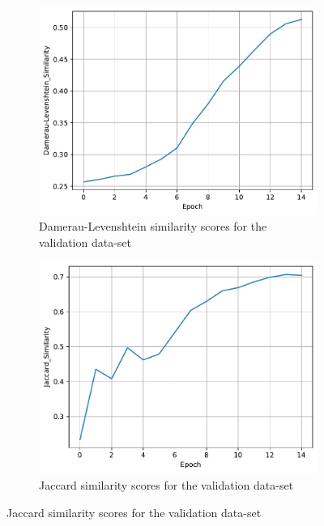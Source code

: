 \documentclass[11pt]{article}
\begin{document}
\begin{figure}[H]
    \vspace{1cm}

    \hspace{0.025\linewidth}
    \begin{subfigure}{0.45\linewidth}
        \centering
        \includegraphics[width=\linewidth]{../data/q3/1/damerau-levenshtein_similarity__val.pdf}
        \caption{Damerau-Levenshtein similarity scores for the validation data-set}
    \end{subfigure}
    \hspace{0.05\linewidth}
    \begin{subfigure}{0.45\linewidth}
        \centering
        \includegraphics[width=\linewidth]{../data/q3/1/jaccard_similarity__val.pdf}
        \caption{Jaccard similarity scores for the validation data-set}
    \end{subfigure}
\end{figure}
\end{document}
